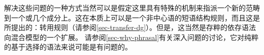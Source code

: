 %
解决这些问题的一种方式当然可以是假定这里具有特殊的机制来指派一个新的范畴到一个或几个成分上。这在本质上可以是一个非中心语的短语结构规则，而且这是\tes 所提出的：转用规则（请参阅\ref{sec-transfer-dg}）。但是，这当然是存粹的依存语法向混合模型的一个扩展。
%
请参阅\ref{sec-why-phrasal}有关深入问题的讨论，它对纯粹的基于选择的语法来说可能是有问题的。
%
